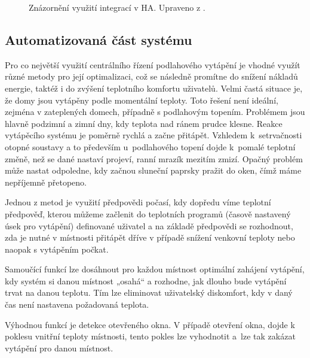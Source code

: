 \begin{figure}[H]
    \centering
    \def\svgwidth{\columnwidth}
    
    \caption[Znázornění využití integrací v~HA.]{Znázornění využití integrací v HA. Upraveno z \cite{home-assistant-integrace}.}
    \label{fig:ha-integrace}
\end{figure}



\subsection{Automatizovaná část systému}
Pro co největší využití centrálního řízení podlahového vytápění je vhodné využít různé metody pro její optimalizaci, což se následně promítne do snížení nákladů energie, taktéž i do zvýšení teplotního komfortu uživatelů. Velmi častá situace je, že domy jsou vytápěny podle momentální teploty. Toto řešení není ideální, zejména v zateplených domech, případně s podlahovým topením. Problémem jsou hlavně podzimní a zimní dny, kdy teplota nad ránem prudce klesne. Reakce vytápěcího systému je poměrně rychlá a začne přitápět. Vzhledem k~setrvačnosti otopné soustavy a to především u~podlahového topení dojde k~pomalé teplotní změně, než se dané nastaví projeví, ranní mrazík mezitím zmizí. Opačný problém může nastat odpoledne, kdy začnou sluneční paprsky pražit do oken, čímž máme nepříjemně přetopeno.

Jednou z metod je využití předpovědi počasí, kdy dopředu víme teplotní předpověď, kterou můžeme začlenit do teplotních programů (časově nastavený úsek pro vytápění) definované uživatel a na základě  předpovědi se rozhodnout, zda je nutné v místnosti přitápět dříve v případě snížení venkovní teploty nebo naopak s vytápěním počkat. 

Samoučící funkcí lze dosáhnout pro každou místnost optimální zahájení vytápění, kdy systém si danou místnost „osahá“ a rozhodne, jak dlouho bude vytápění trvat na danou teplotu. Tím lze eliminovat uživatelský diskomfort, kdy v daný čas není nastavena požadovaná teplota.

Výhodnou funkcí je detekce otevřeného okna. V případě otevření okna, dojde k poklesu vnitřní teploty místnosti, tento pokles lze vyhodnotit a~lze tak zakázat vytápění pro danou místnost.

